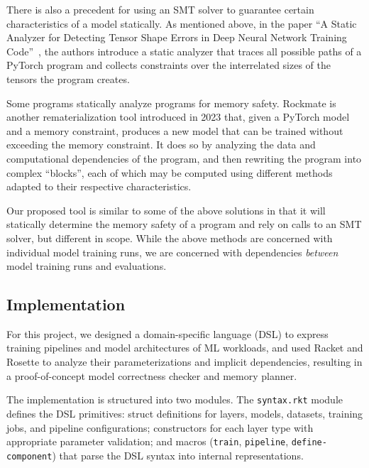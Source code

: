 \documentclass{nfr}
\begin{document}
There is also a precedent for using an SMT solver to guarantee certain characteristics of a model statically. As mentioned above, in the paper ``A Static Analyzer for Detecting Tensor Shape Errors in Deep Neural Network Training Code''~\cite{analyzer}, the authors introduce a static analyzer that traces all possible paths of a PyTorch program and collects constraints over the interrelated sizes of the tensors the program creates. 

Some programs statically analyze programs for memory safety. Rockmate \cite{zhao2023rockmateefficientfastautomatic} is another rematerialization tool introduced in 2023 that, given a PyTorch model and a memory constraint, produces a new model that can be trained without exceeding the memory constraint. It does so by analyzing the data and computational dependencies of the program, and then rewriting the program into complex ``blocks'', each of which may be computed using different methods adapted to their respective characteristics. 

Our proposed tool is similar to some of the above solutions in that it will statically determine the memory safety of a program and rely on calls to an SMT solver, but different in scope. While the above methods are concerned with individual model training runs, we are concerned with dependencies \textit{between} model training runs and evaluations. 

\subsection{Implementation}
For this project, we designed a domain-specific language (DSL) to express training pipelines and model architectures of ML workloads, and used Racket and Rosette to analyze their parameterizations and implicit dependencies, resulting in a proof-of-concept model correctness checker and memory planner.

The implementation is structured into two modules. The \texttt{syntax.rkt} module defines the DSL primitives: struct definitions for layers, models, datasets, training jobs, and pipeline configurations; constructors for each layer type with appropriate parameter validation; and macros (\texttt{train}, \texttt{pipeline}, \texttt{define-component}) that parse the DSL syntax into internal representations.
\end{document}
